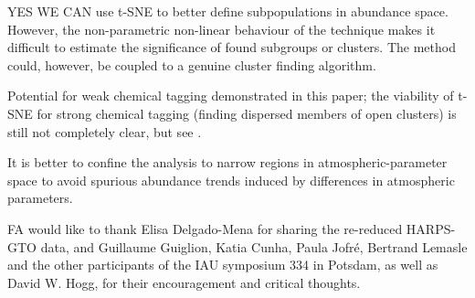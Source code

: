 \documentclass{aa}  %
\begin{document}
YES WE CAN use t-SNE to better define subpopulations in abundance space. However, the non-parametric non-linear behaviour of the technique makes it difficult to estimate the significance of found subgroups or clusters. The method could, however, be coupled to a genuine cluster finding algorithm.

Potential for weak chemical tagging demonstrated in this paper; the viability of t-SNE for strong chemical tagging (finding dispersed members of open clusters) is still not completely clear, but see \citet{Kos2017}.

It is better to confine the analysis to narrow regions in atmospheric-parameter space to avoid spurious abundance trends induced by differences in atmospheric parameters. 







\begin{acknowledgements}
FA would like to thank Elisa Delgado-Mena for sharing the re-reduced HARPS-GTO data, and Guillaume Guiglion, Katia Cunha, Paula Jofr\'e, Bertrand Lemasle and the other participants of the IAU symposium 334 in Potsdam, as well as David W. Hogg, for their encouragement and critical thoughts. 

\end{acknowledgements}

\end{document}
